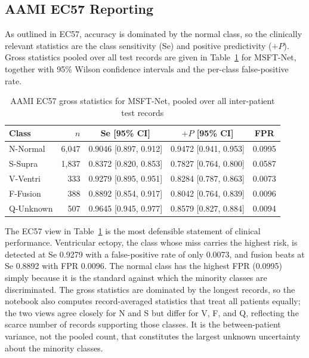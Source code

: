 \subsection{AAMI EC57 Reporting}
\label{subsec:ec57}

As outlined in EC57, accuracy is dominated by the normal class, so the
clinically relevant statistics are the class sensitivity (Se) and positive
predictivity ($+P$). Gross statistics pooled over all test records are
given in Table~\ref{tab:ec57} for MSFT-Net, together with 95\% Wilson
confidence intervals and the per-class false-positive rate.

\begin{table}[!t]
\centering
\caption{AAMI EC57 gross statistics for MSFT-Net, pooled over all inter-patient test records}
\label{tab:ec57}
\begin{tabular}{lrccc}
\toprule
\textbf{Class} & \textbf{$n$} & \textbf{Se [95\% CI]} & \textbf{$+P$ [95\% CI]} & \textbf{FPR} \\
\midrule
N-Normal  & 6{,}047 & 0.9046 [0.897, 0.912] & 0.9472 [0.941, 0.953] & 0.0995 \\
S-Supra   & 1{,}837 & 0.8372 [0.820, 0.853] & 0.7827 [0.764, 0.800] & 0.0587 \\
V-Ventri  &   333   & 0.9279 [0.895, 0.951] & 0.8284 [0.787, 0.863] & 0.0073 \\
F-Fusion  &   388   & 0.8892 [0.854, 0.917] & 0.8042 [0.764, 0.839] & 0.0096 \\
Q-Unknown &   507   & 0.9645 [0.945, 0.977] & 0.8579 [0.827, 0.884] & 0.0094 \\
\bottomrule
\end{tabular}
\end{table}

The EC57 view in Table~\ref{tab:ec57} is the most defensible statement of
clinical performance. Ventricular ectopy, the class whose miss carries the
highest risk, is detected at Se 0.9279 with a false-positive rate of only
0.0073, and fusion beats at Se 0.8892 with FPR 0.0096. The normal class has
the highest FPR (0.0995) simply because it is the standard against which
the minority classes are discriminated. The gross statistics are dominated
by the longest records, so the notebook also computes record-averaged
statistics that treat all patients equally; the two views agree closely for
N and S but differ for V, F, and Q, reflecting the scarce number of records
supporting those classes. It is the between-patient variance, not the
pooled count, that constitutes the largest unknown uncertainty about the
minority classes.

